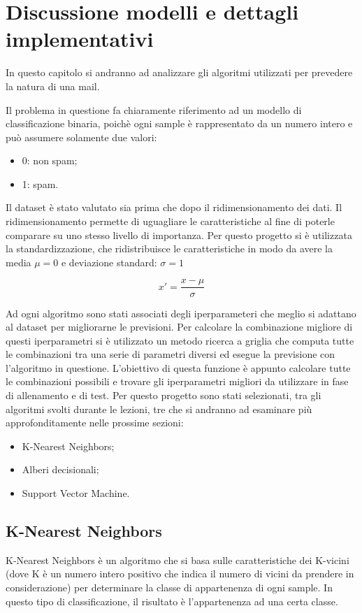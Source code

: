 \documentclass[12pt,a4paper]{article}
\begin{document}
\clearpage
\section{Discussione modelli e dettagli implementativi}
In questo capitolo si andranno ad analizzare gli algoritmi utilizzati per prevedere la  natura di una mail.

Il problema in questione fa chiaramente riferimento ad un modello di classificazione binaria, poichè ogni sample è rappresentato da un numero intero e può assumere solamente due valori:
\begin{itemize}
    \item 0: non spam;
    \item 1: spam.
\end{itemize}

Il dataset è stato valutato sia prima che dopo il ridimensionamento dei dati.
Il ridimensionamento permette di uguagliare le caratteristiche al fine di poterle comparare su uno stesso livello di importanza.
Per questo progetto si è utilizzata la standardizzazione, che ridistribuisce le caratteristiche in modo da avere la media
\(\mu = 0 \)
e deviazione standard:
\(\sigma = 1 \)



\begin{equation}
    x' = \frac{x-\mu}{\sigma}
\end{equation}

Ad ogni algoritmo sono stati associati degli iperparameteri che meglio si adattano al dataset per migliorarne le previsioni. Per calcolare la combinazione migliore di questi iperparametri si è utilizzato un metodo ricerca a griglia che computa tutte le combinazioni tra una serie di parametri diversi ed esegue la previsione con l'algoritmo in questione. L'obiettivo di questa funzione è appunto calcolare tutte le combinazioni possibili e trovare gli iperparametri migliori da utilizzare in fase di allenamento e di test.
\break\break
Per questo progetto sono stati selezionati, tra gli algoritmi svolti durante le lezioni, tre che si andranno ad esaminare più approfonditamente nelle prossime sezioni:
\begin{itemize}
    \item K-Nearest Neighbors;
    \item Alberi decisionali;
    \item Support Vector Machine.
\end{itemize}

\clearpage
\subsection{K-Nearest Neighbors}
K-Nearest Neighbors è un algoritmo che si basa sulle caratteristiche dei K-vicini (dove K è un numero intero positivo che indica il numero di vicini da prendere in considerazione) per determinare la classe di appartenenza di ogni sample.
In questo tipo di classificazione, il risultato è l'appartenenza ad una certa classe.
\end{document}
